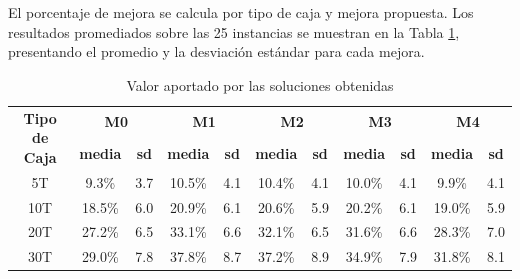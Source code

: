 \documentclass[openany]{article}
\begin{document}
El porcentaje de mejora se calcula por tipo de caja y mejora propuesta. Los resultados promediados sobre las 25 instancias se muestran en la Tabla \ref{tab:valor_aportado}, presentando el promedio y la desviación estándar para cada mejora.

\begin{table}[H]
    \centering
    \caption{Valor aportado por las soluciones obtenidas}
    \label{tab:valor_aportado}
    \begin{tabular}{|c|c|c|c|c|c|c|c|c|c|c|}
        \hline
        \multirow{2}{*}{\textbf{Tipo de Caja}} & \multicolumn{2}{c|}{\textbf{M0}} & \multicolumn{2}{c|}{\textbf{M1}} & \multicolumn{2}{c|}{\textbf{M2}} & \multicolumn{2}{c|}{\textbf{M3}} & \multicolumn{2}{c|}{\textbf{M4}}                                                                             \\ \cline{2-11}
                                               & \textbf{media}                   & \textbf{sd}                      & \textbf{media}                   & \textbf{sd}                      & \textbf{media}                   & \textbf{sd} & \textbf{media} & \textbf{sd} & \textbf{media} & \textbf{sd} \\ \hline
        5T                                     & 9.3\%                            & 3.7                              & 10.5\%                           & 4.1                              & 10.4\%                           & 4.1         & 10.0\%         & 4.1         & 9.9\%          & 4.1         \\ \hline
        10T                                    & 18.5\%                           & 6.0                              & 20.9\%                           & 6.1                              & 20.6\%                           & 5.9         & 20.2\%         & 6.1         & 19.0\%         & 5.9         \\ \hline
        20T                                    & 27.2\%                           & 6.5                              & 33.1\%                           & 6.6                              & 32.1\%                           & 6.5         & 31.6\%         & 6.6         & 28.3\%         & 7.0         \\ \hline
        30T                                    & 29.0\%                           & 7.8                              & 37.8\%                           & 8.7                              & 37.2\%                           & 8.9         & 34.9\%         & 7.9         & 31.8\%         & 8.1         \\ \hline

\end{tabular}
\end{table}
\end{document}
